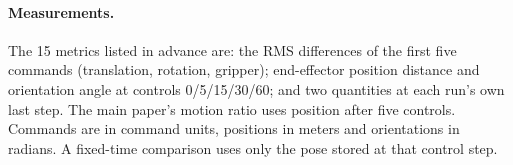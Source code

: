 \paragraph{Measurements.}
The 15 metrics listed in advance are: the RMS differences of the first five commands (translation, rotation, gripper); end-effector position distance and orientation angle at controls 0/5/15/30/60; and two quantities at each run's own last step. The main paper's motion ratio uses position after five controls. Commands are in command units, positions in meters and orientations in radians. A fixed-time comparison uses only the pose stored at that control step.

\begin{table}[t]
\caption{\textbf{Relative to a clean rerun, Camera moves the end effector further after 60 controls in both policies, while several families change the commands less than a rerun does.} B, C, L, S: Background, Camera, Light, Sensor Noise. Columns: $TR-RR$ and the ratio of task means $TR/RR$ for the first five commands (translation, command units) and for end-effector (EEF) position after control 60 (meters). $TR$, $RR$: perturbed--clean and clean-rerun distance. Joint $N$/tasks: settings with all three distances measured in the same record. Brackets: pointwise 95\% intervals from paired whole-task draws on the support shown. Each of the 720 comparisons listed in advance keeps its own measured support.}


\end{table}
